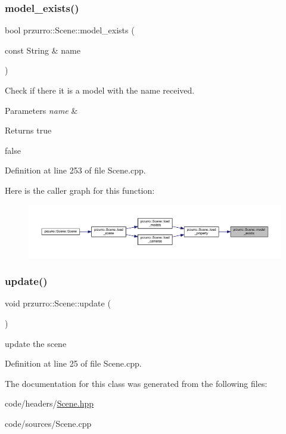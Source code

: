 \subsubsection{\texorpdfstring{model\_exists()}{model\_exists()}}
{\footnotesize\ttfamily bool przurro\+::\+Scene\+::model\+\_\+exists (\begin{DoxyParamCaption}\item[{const String \&}]{name }\end{DoxyParamCaption})}



Check if there it is a model with the name received. 


\begin{DoxyParams}{Parameters}
{\em name} & \\
\hline
\end{DoxyParams}
\begin{DoxyReturn}{Returns}
true 

false 
\end{DoxyReturn}


Definition at line 253 of file Scene.\+cpp.

Here is the caller graph for this function\+:
\nopagebreak
\begin{figure}[H]
\begin{center}
\leavevmode
\includegraphics[width=350pt]{d8/d56/classprzurro_1_1_scene_acd91a4c5188aa41add75a093de32b664_icgraph}
\end{center}
\end{figure}
\mbox{\label{classprzurro_1_1_scene_aeead0368cdf439e638de159ea00fce8e}} 
\subsubsection{\texorpdfstring{update()}{update()}}
{\footnotesize\ttfamily void przurro\+::\+Scene\+::update (\begin{DoxyParamCaption}{ }\end{DoxyParamCaption})}



update the scene 



Definition at line 25 of file Scene.\+cpp.



The documentation for this class was generated from the following files\+:\begin{DoxyCompactItemize}
\item 
code/headers/\mbox{\hyperlink{_scene_8hpp}{Scene.\+hpp}}\item 
code/sources/Scene.\+cpp\end{DoxyCompactItemize}
